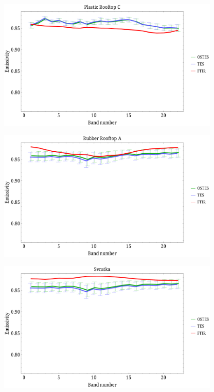 \documentclass[xcolor=dvipsnames]{beamer}
\begin{document}
\begin{frame}[plain]{}
\begin{figure}[htb]
	\centering
	\includegraphics[scale=0.35]{PlasticRooftopC.pdf}
\end{figure}
\end{frame}

\begin{frame}[plain]{}
\begin{figure}[htb]
	\centering
	\includegraphics[scale=0.35]{RubberRooftopA.pdf}
\end{figure}
\end{frame}

\begin{frame}[plain]{}
\begin{figure}[htb]
	\centering
	\includegraphics[scale=0.35]{Svratka.pdf}
\end{figure}
\end{frame}
\end{document}
